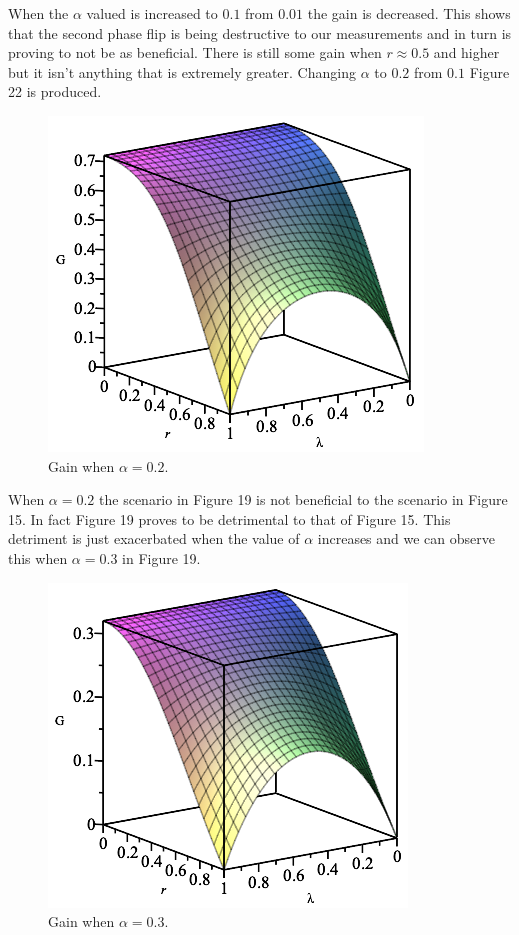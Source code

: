 \documentclass[twocolumn]{article}
\begin{document}
\newline
When the $\alpha$ valued is increased to $0.1$ from $0.01$ the gain is decreased. This shows that the second phase flip is being destructive to our measurements and in turn is proving to not be as beneficial. There is still some gain when $r\approx0.5$ and higher but it isn't anything that is extremely greater. Changing $\alpha$ to $0.2$ from $0.1$ Figure 22 is produced.
\newpage
\begin{figure}[h]
\begin{center}
\includegraphics[width=0.65\linewidth]{Phase-Flip-Two-Channel-Alpha=02-Gain.png}
\caption{Gain when $\alpha=0.2$.}
\end{center}
\end{figure}
When $\alpha=0.2$ the scenario in Figure 19 is not beneficial to the scenario in Figure 15. In fact Figure 19 proves to be detrimental to that of Figure 15. This detriment is just exacerbated when the value of $\alpha$ increases and we can observe this when $\alpha=0.3$ in Figure 19.
\begin{figure}[h]
\begin{center}
\includegraphics[width=0.65\linewidth]{Phase-Flip-Two-Channel-Alpha=03-Gain.png}
\caption{Gain when $\alpha=0.3$.}
\end{center}
\end{figure}
\end{document}
